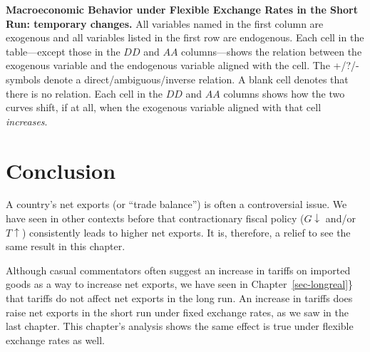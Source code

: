 \documentclass[
  letterpaper,
]{book}
\theoremstyle{plain}
\theoremstyle{remark}
\begin{document}
\begin{table}

\caption{\label{tbl-short-temp}\textbf{Macroeconomic Behavior under
Flexible Exchange Rates in the Short Run: temporary changes.} All
variables named in the first column are exogenous and all variables
listed in the first row are endogenous. Each cell in the table---except
those in the \(DD\) and \(AA\) columns---shows the relation between the
exogenous variable and the endogenous variable aligned with the cell.
The +/?/- symbols denote a direct/ambiguous/inverse relation. A blank
cell denotes that there is no relation. Each cell in the \(DD\) and
\(AA\) columns shows how the two curves shift, if at all, when the
exogenous variable aligned with that cell \emph{increases}.}


\end{table}%

\section{Conclusion}\label{sec-conclusion-short-temp}

A country's net exports (or ``trade balance'') is often a controversial
issue. We have seen in other contexts before that contractionary fiscal
policy (\(G\downarrow\) and/or \(T\uparrow\)) consistently leads to
higher net exports. It is, therefore, a relief to see the same result in
this chapter.

Although casual commentators often suggest an increase in tariffs on
imported goods as a way to increase net exports, we have seen in
Chapter~\ref{sec-longreal}\} that tariffs do not affect net exports in
the long run. An increase in tariffs does raise net exports in the short
run under fixed exchange rates, as we saw in the last chapter. This
chapter's analysis shows the same effect is true under flexible exchange
rates as well.
\end{document}
